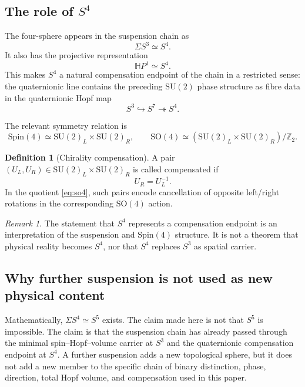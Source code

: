 \documentclass[11pt,a4paper]{article}
\theoremstyle{definition}
\newtheorem{definition}[theorem]{Definition}
\theoremstyle{remark}
\newtheorem{remark}[theorem]{Remark}
\newcommand{\Sthree}{S^{3}}
\newcommand{\Sfour}{S^{4}}
\newcommand{\Sfive}{S^{5}}
\newcommand{\Sseven}{S^{7}}
\newcommand{\HP}{\mathbb{H}P}
\newcommand{\Z}{\mathbb{Z}}
\newcommand{\SU}{\mathrm{SU}}
\newcommand{\SO}{\mathrm{SO}}
\newcommand{\Spin}{\mathrm{Spin}}
\begin{document}
\subsection{The role of \texorpdfstring{$\Sfour$}{S4}}

The four-sphere appears in the suspension chain as
\[
\Sigma\Sthree\simeq\Sfour.
\]
It also has the projective representation
\begin{equation}
\HP^{1}\simeq\Sfour.
\end{equation}
This makes $\Sfour$ a natural compensation endpoint of the chain in a restricted sense: the quaternionic line
contains the preceding $\SU(2)$ phase structure as fibre data in the quaternionic Hopf map
\[
\Sthree\hookrightarrow\Sseven\twoheadrightarrow\Sfour.
\]

The relevant symmetry relation is
\begin{equation}
\Spin(4)\simeq \SU(2)_{L}\times\SU(2)_{R},
\qquad
\SO(4)\simeq(\SU(2)_{L}\times\SU(2)_{R})/\Z_{2}.
\label{eq:so4}
\end{equation}

\begin{definition}[Chirality compensation]
A pair $(U_{L},U_{R})\in\SU(2)_{L}\times\SU(2)_{R}$ is called compensated if
\begin{equation}
U_{R}=U_{L}^{-1}.
\end{equation}
In the quotient \eqref{eq:so4}, such pairs encode cancellation of opposite left/right rotations
in the corresponding $\SO(4)$ action.
\end{definition}

\begin{remark}
The statement that $\Sfour$ represents a compensation endpoint is an interpretation of the
suspension and $\Spin(4)$ structure.  It is not a theorem that physical reality becomes $\Sfour$,
nor that $\Sfour$ replaces $\Sthree$ as spatial carrier.
\end{remark}

\subsection{Why further suspension is not used as new physical content}

Mathematically, $\Sigma\Sfour\simeq\Sfive$ exists.  The claim made here is not that $\Sfive$
is impossible.  The claim is that the suspension chain has already passed through the minimal
spin--Hopf--volume carrier at $\Sthree$ and the quaternionic compensation endpoint at $\Sfour$.
A further suspension adds a new topological sphere, but it does not add a new member to the
specific chain of binary distinction, phase, direction, total Hopf volume, and compensation used
in this paper.
\end{document}

